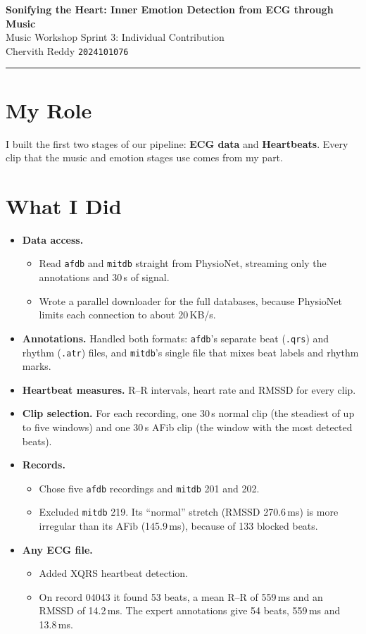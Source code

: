 \documentclass[11pt,a4paper]{article}
\begin{document}
\begin{center}
  {\Large\bfseries Sonifying the Heart: Inner Emotion Detection from ECG through Music}\\[6pt]
  Music Workshop Sprint 3: Individual Contribution\\[8pt]
  {\large Chervith Reddy} \quad \texttt{2024101076}
\end{center}
\noindent\rule{\textwidth}{0.4pt}

\section{My Role}
I built the first two stages of our pipeline: \textbf{ECG data} and \textbf{Heartbeats}. Every
clip that the music and emotion stages use comes from my part.

\section{What I Did}
\begin{itemize}
  \item \textbf{Data access.}
    \begin{itemize}
      \item Read \texttt{afdb} and \texttt{mitdb} straight from PhysioNet, streaming only the
        annotations and 30\,s of signal.
      \item Wrote a parallel downloader for the full databases, because PhysioNet limits each
        connection to about 20\,KB/s.
    \end{itemize}
  \item \textbf{Annotations.} Handled both formats: \texttt{afdb}'s separate beat (\texttt{.qrs})
    and rhythm (\texttt{.atr}) files, and \texttt{mitdb}'s single file that mixes beat labels and
    rhythm marks.
  \item \textbf{Heartbeat measures.} R--R intervals, heart rate and RMSSD for every clip.
  \item \textbf{Clip selection.} For each recording, one 30\,s normal clip (the steadiest of up to
    five windows) and one 30\,s AFib clip (the window with the most detected beats).
  \item \textbf{Records.}
    \begin{itemize}
      \item Chose five \texttt{afdb} recordings and \texttt{mitdb} 201 and 202.
      \item Excluded \texttt{mitdb} 219. Its ``normal'' stretch (RMSSD 270.6\,ms) is more
        irregular than its AFib (145.9\,ms), because of 133 blocked beats.
    \end{itemize}
  \item \textbf{Any ECG file.}
    \begin{itemize}
      \item Added XQRS heartbeat detection.
      \item On record 04043 it found 53 beats, a mean R--R of 559\,ms and an RMSSD of 14.2\,ms.
        The expert annotations give 54 beats, 559\,ms and 13.8\,ms.
    \end{itemize}
\end{itemize}
\end{document}
